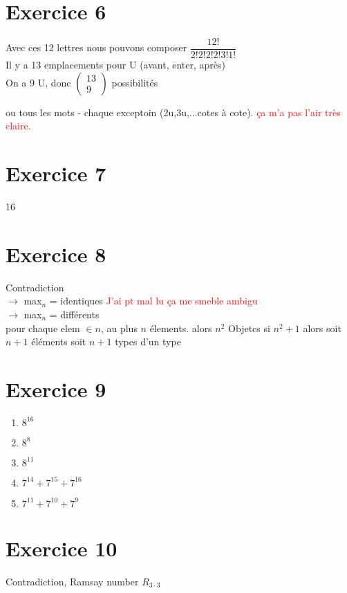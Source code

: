\documentclass[fontsize=10pt]{article}
\begin{document}
\section*{Exercice 6}
Avec ces 12 lettres nous pouvons composer $\dfrac{12!}{2!2!2!2!3!1!}$\\
Il y a 13 emplacements pour U (avant, enter, après)\\
On a 9 U, donc $\begin{pmatrix}
13\\
9
\end{pmatrix}$ possibilités

ou tous les mots - chaque exceptoin (2u,3u,$\dots$cotes à cote). \textcolor{red}{ ça m'a pas l'air très claire.}
\section*{Exercice 7}
16
\section*{Exercice 8}
Contradiction\\
$\rightarrow$ max$_n$ = identiques \textcolor{red}{ J'ai pt mal lu ça me smeble ambigu}\\  
$\rightarrow$ max$_n$ = différents\\
pour chaque elem $\in n$, au plus $n$ élements.
alors $n^2$ Objetcs
si $n^2+1$ alors soit $n+1$ éléments soit $n+1$ types d'un type
\section*{Exercice 9}
\begin{enumerate}
\item $8^{16}$
\item $8^8$
\item $8^{11}$
\item $7^{14}+7^{15}+7^{16}$
\item $7^{11}+7^{10}+7^{9}$
\end{enumerate}
\section*{Exercice 10}
Contradiction, Ramsay number $R_{3\cdot3}$
\end{document}
